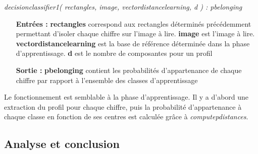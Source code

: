 \textit{decisionclassifier1( rectangles, image, vectordistancelearning, d ) : pbelonging}\\
\begin{itemize}
	\item[\textbf{Entrées :}] \textbf{rectangles} correspond aux rectangles déterminés précédemment permettant d'isoler chaque chiffre sur l'image à lire. \textbf{image} est l'image à lire. \textbf{vectordistancelearning} est la base de référence déterminée dans la phase d'apprentissage. \textbf{d} est le nombre de composantes pour un profil
	\item[\textbf{Sortie :}] \textbf{pbelonging} contient les probabilités d'appartenance de chaque chiffre par rapport à l'ensemble des classes d'apprentissage
\end{itemize}
Le fonctionnement est semblable à la phase d'apprentissage. Il y a d'abord une extraction du profil pour chaque chiffre, puis la probabilité d'appartenance à chaque classe en fonction de ses centres est calculée grâce à \textit{computepdistances}.

\subsection{Analyse et conclusion}

